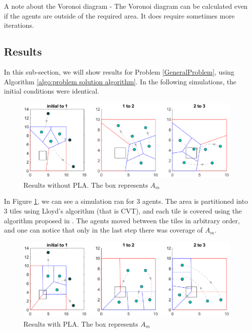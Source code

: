 \documentclass{iacas}
\begin{document}
A note about the Voronoi diagram - The Voronoi diagram can be calculated even if the agents are outside of the required area. It does require sometimes more iterations.


\subsection{Results}
In this sub-section, we will show results for Problem \ref{GeneralProblem}, using Algorithm \ref{algo:problem solution algorithm}.
%
In the following simulations, the initial conditions were identical.

\begin{figure}[H]
\includegraphics[scale=0.8]{figures/proposed-sol/results/sim1-3agents-3partitions-noPLA.eps}
\caption{Results without PLA. The box represents $A_m$}
\label{fig:results no PLA}
\end{figure}

In Figure \ref{fig:results no PLA}, we can see a simulation ran for 3 agents. The area is partitioned into 3 tiles using Lloyd's algorithm (that is CVT), and each tile is covered using the algorithm proposed in \cite{Cortes2004}. The agents moved between the tiles in arbitrary order, and one can notice that only in the last step there was coverage of $A_m$.

\begin{figure}[H]
\includegraphics[scale=0.8]{figures/proposed-sol/results/sim2-3agents-3partitions-PLA.eps}
\caption{Results with PLA. The box represents $A_m$}
\label{fig:results PLA}
\end{figure}
\end{document}
